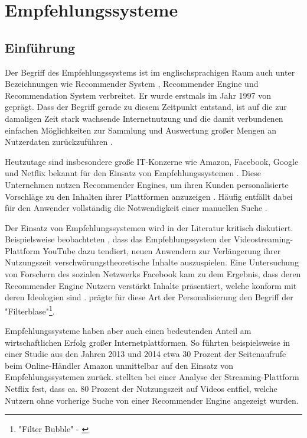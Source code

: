 
\chapter{Empfehlungssysteme}
\label{ch:empfehlungssysteme}

\section{Einführung}
\label{ch:empfehlungssysteme:einfuehrung}
Der Begriff des Empfehlungssystems ist im englischsprachigen Raum auch unter Bezeichnungen wie Recommender System \cite[S. 1]{lu:2015}, Recommender Engine \cite[S. 1]{panigrahi:2016} und Recommendation System \cite[S. 1]{ebesu:2018} verbreitet. Er wurde erstmals im Jahr 1997 von \textcite[S. 1]{resnick:1997} geprägt. Dass der Begriff gerade zu diesem Zeitpunkt entstand, ist auf die zur damaligen Zeit stark wachsende Internetnutzung und die damit verbundenen einfachen Möglichkeiten zur Sammlung und Auswertung großer Mengen an Nutzerdaten zurückzuführen \cite[S. xvii]{recommenderSystems:2016}.

Heutzutage sind insbesondere große IT-Konzerne wie Amazon, Facebook, Google und Netflix bekannt für den Einsatz von Empfehlungssystemen \cite[S. 1]{zarzour:2018}. Diese Unternehmen nutzen Recommender Engines, um ihren Kunden personalisierte Vorschläge zu den Inhalten ihrer Plattformen anzuzeigen \cite[S. 2]{jeckmans:2013}. Häufig entfällt dabei für den Anwender vollständig die Notwendigkeit einer manuellen Suche \cite[S. 1]{comibingCareer:2013}.

Der Einsatz von Empfehlungssystemen wird in der Literatur kritisch diskutiert. Beispielsweise beobachteten \textcite[S. 17f.]{alfano:2020}, dass das Empfehlungssystem der Videostreaming-Plattform YouTube dazu tendiert, neuen Anwendern zur Verlängerung ihrer Nutzungszeit verschwörungstheoretische Inhalte auszuspielen. Eine Untersuchung von Forschern des sozialen Netzwerks Facebook kam zu dem Ergebnis, dass deren Recommender Engine Nutzern verstärkt Inhalte präsentiert, welche konform mit deren Ideologien sind \cite[S. 2]{bakshy:2015}. \textcite[S. 17, Z. 25]{pariser:2012} prägte für diese Art der Personalisierung den Begriff der "Filterblase"\footnote{"Filter Bubble" - \textcite[S. 17, Z. 25]{pariser:2012}}.

Empfehlungssysteme haben aber auch einen bedeutenden Anteil am wirtschaftlichen Erfolg großer Internetplattformen. So führten beispielsweise \textcite[S. 6f.]{sharma:2015} in einer Studie aus den Jahren 2013 und 2014 etwa 30 Prozent der Seitenaufrufe beim Online-Händler Amazon unmittelbar auf den Einsatz von Empfehlungssystemen zurück. \textcite[S. 5]{gomezuribe:2016} stellten bei einer Analyse der Streaming-Plattform Netflix fest, dass ca. 80 Prozent der Nutzungszeit auf Videos entfiel, welche Nutzern ohne vorherige Suche von einer Recommender Engine angezeigt wurden.

